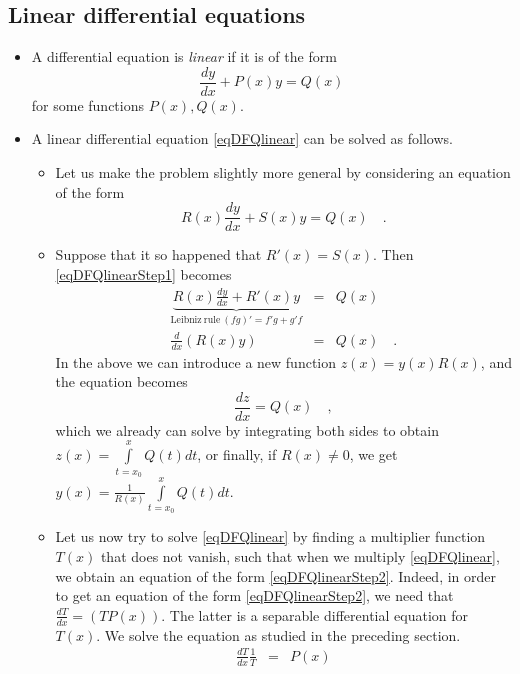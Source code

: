 \documentclass[12pt]{book}
\begin{document}
\subsection{Linear differential equations}
\begin{itemize}
\item A differential equation is \emph{linear} if it is of the form 
\begin{equation}\label{eqDFQlinear}
\frac{dy}{dx} + P(x)y=Q(x)
\end{equation}
for some functions $P(x),Q(x)$.
\item A linear differential equation \eqref{eqDFQlinear} can be solved as follows.
\begin{itemize}
\item  Let us make the problem slightly more general by considering an equation of the form 
\begin{equation}\label{eqDFQlinearStep1}
R(x)\frac{dy}{dx} + S(x)y=Q(x)\quad .
\end{equation}
\item Suppose that it so happened that $R'(x)=S(x)$. Then \eqref{eqDFQlinearStep1} becomes
\begin{equation}\label{eqDFQlinearStep2}
\begin{array}{rcl}
\underbrace{R(x)\frac{dy}{dx} + R'(x)y}_{\mathrm{Leibniz~rule~}(fg)'=f'g+g'f}&=&Q(x)\\
\frac{d}{dx} \left(R(x)y \right)&=& Q(x)\quad .
\end{array}
\end{equation}
In the above we can introduce a new function $z(x)= y(x)R(x)$, and the equation becomes 
\[
\frac{dz}{dx}= Q(x)\quad ,
\]
which we already can solve by integrating both sides to obtain $z(x)= \int\limits_{t=x_0}^x Q(t)dt $, or finally, if $R(x)\neq 0$, we get $y(x)= \frac{1}{R(x)}\int\limits_{t=x_0}^x Q(t)dt $.
\item Let us now try to solve \eqref{eqDFQlinear} by finding a multiplier function $T(x)$ that does not vanish, such that when we multiply \eqref{eqDFQlinear}, we obtain an equation of the form \eqref{eqDFQlinearStep2}. Indeed, in order to get an equation of the form \eqref{eqDFQlinearStep2}, we need that $\frac{dT}{dx}= (TP(x))$. The latter is a separable differential equation for $T(x)$.  We solve the equation as studied in the preceding section.
\begin{equation}\label{eqDFQlinearStep3}
\begin{array}{rcl}
\frac{dT}{dx}\frac{1}{T}&=&P(x)\\

\end{array}
\end{equation}
\end{itemize}
\end{itemize}
\end{document}
